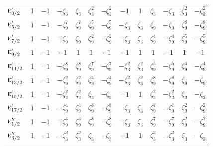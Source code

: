 \documentclass[10pt,a4paper]{article}
\numberwithin{equation}{section}
\newcommand{\irr}[1]{\text{\normalfont\scshape #1}}
\newcommand{\rootunity}[1]{\zeta_{#1}}
\begin{document}
{\begin{longtable}{@{}lcccccccccccc@{}}
$\irr{e}_{3/2}'$ & $1$ & $-1$ & $-\rootunity{3}$ & $\rootunity{3}$ & $\rootunity{3}^{2}$ & $-\rootunity{3}^{2}$ & $-1$ & $1$ & $\rootunity{3}$ & $-\rootunity{3}$ & $\rootunity{3}^{2}$ & $-\rootunity{3}^{2}$\\
$\irr{e}_{5/2}'$ & $1$ & $-1$ & $-\rootunity{9}^{7}$ & $\rootunity{9}^{7}$ & $\rootunity{9}^{5}$ & $-\rootunity{9}^{5}$ & $-\rootunity{3}$ & $\rootunity{3}$ & $\rootunity{9}$ & $-\rootunity{9}$ & $\rootunity{9}^{8}$ & $-\rootunity{9}^{8}$\\
$\irr{e}_{7/2}'$ & $1$ & $-1$ & $-\rootunity{9}$ & $\rootunity{9}$ & $\rootunity{9}^{2}$ & $-\rootunity{9}^{2}$ & $-\rootunity{3}$ & $\rootunity{3}$ & $\rootunity{9}^{4}$ & $-\rootunity{9}^{4}$ & $\rootunity{9}^{5}$ & $-\rootunity{9}^{5}$\\
$\irr{e}_{9/2}'$ & $1$ & $-1$ & $-1$ & $1$ & $1$ & $-1$ & $-1$ & $1$ & $1$ & $-1$ & $1$ & $-1$\\
$\irr{e}_{11/2}'$ & $1$ & $-1$ & $-\rootunity{9}^{8}$ & $\rootunity{9}^{8}$ & $\rootunity{9}^{7}$ & $-\rootunity{9}^{7}$ & $-\rootunity{3}^{2}$ & $\rootunity{3}^{2}$ & $\rootunity{9}^{5}$ & $-\rootunity{9}^{5}$ & $\rootunity{9}^{4}$ & $-\rootunity{9}^{4}$\\
$\irr{e}_{13/2}'$ & $1$ & $-1$ & $-\rootunity{9}^{2}$ & $\rootunity{9}^{2}$ & $\rootunity{9}^{4}$ & $-\rootunity{9}^{4}$ & $-\rootunity{3}^{2}$ & $\rootunity{3}^{2}$ & $\rootunity{9}^{8}$ & $-\rootunity{9}^{8}$ & $\rootunity{9}$ & $-\rootunity{9}$\\
$\irr{e}_{15/2}'$ & $1$ & $-1$ & $-\rootunity{3}^{2}$ & $\rootunity{3}^{2}$ & $\rootunity{3}$ & $-\rootunity{3}$ & $-1$ & $1$ & $\rootunity{3}^{2}$ & $-\rootunity{3}^{2}$ & $\rootunity{3}$ & $-\rootunity{3}$\\
$\irr{e}_{17/2}'$ & $1$ & $-1$ & $-\rootunity{9}^{4}$ & $\rootunity{9}^{4}$ & $\rootunity{9}^{8}$ & $-\rootunity{9}^{8}$ & $-\rootunity{3}$ & $\rootunity{3}$ & $\rootunity{9}^{7}$ & $-\rootunity{9}^{7}$ & $\rootunity{9}^{2}$ & $-\rootunity{9}^{2}$\\
$\irr{e}_{1/2}''$ & $1$ & $-1$ & $-\rootunity{9}^{4}$ & $\rootunity{9}^{4}$ & $\rootunity{9}^{8}$ & $-\rootunity{9}^{8}$ & $-\rootunity{3}$ & $\rootunity{3}$ & $\rootunity{9}^{7}$ & $-\rootunity{9}^{7}$ & $\rootunity{9}^{2}$ & $-\rootunity{9}^{2}$\\
$\irr{e}_{3/2}''$ & $1$ & $-1$ & $-\rootunity{3}^{2}$ & $\rootunity{3}^{2}$ & $\rootunity{3}$ & $-\rootunity{3}$ & $-1$ & $1$ & $\rootunity{3}^{2}$ & $-\rootunity{3}^{2}$ & $\rootunity{3}$ & $-\rootunity{3}$\\

\end{longtable}}
\end{document}

